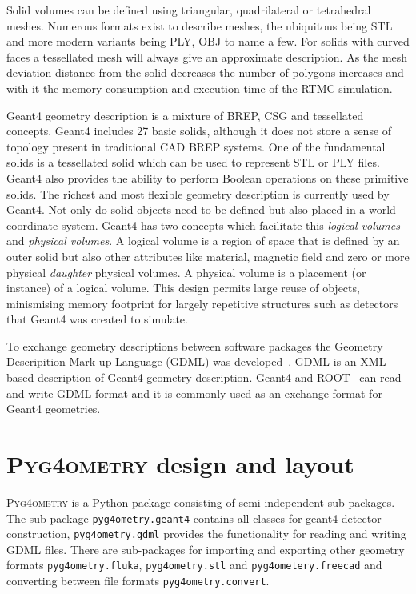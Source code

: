 \documentclass[final,5p,times,twocolumn]{elsarticle}
\newcommand{\pyinline}[1]{\lstinline[postbreak={}]{#1}}
\newcommand{\PYGEOMETRY}{\textsc{Pyg4ometry}}
\begin{document}
Solid volumes can be defined using triangular, quadrilateral or tetrahedral meshes. Numerous formats exist to describe meshes, the ubiquitous being STL and 
more modern variants being PLY, OBJ to name a few. For solids with curved faces a tessellated mesh will always give an approximate description. As the mesh 
deviation distance from the solid decreases the number of polygons increases and with it the memory consumption and execution time of the RTMC simulation. 

Geant4 geometry description is a mixture of BREP, CSG and tessellated concepts. Geant4 includes 27 basic solids, although it does not store a sense 
of topology present in traditional CAD BREP systems. One of the fundamental solids is a tessellated solid which can be used to represent STL or PLY files. 
Geant4 also provides the ability to perform Boolean operations on these primitive solids. The richest and most flexible geometry description is currently used by
Geant4. Not only do solid objects need to be defined but also placed in a world coordinate system. Geant4 has two concepts which facilitate this {\em logical volumes} and {\em physical volumes}. A logical volume is a region of space that is defined by an outer solid but also other attributes like material, magnetic field 
and zero or more physical {\em daughter} physical volumes. A physical volume is a placement (or instance) of a logical volume. This design permits large reuse of objects, minismising memory footprint for largely repetitive structures such as detectors that Geant4 was created to simulate.  


To exchange geometry descriptions between software packages the Geometry Descripition Mark-up Language (GDML) was developed~\cite{GDML}. 
GDML is an XML-based description of Geant4 geometry description. Geant4 and ROOT~\cite{fons_rademakers_2019_3895860} can read and write 
GDML format and it is commonly used as an exchange format for Geant4 geometries. 

\section{\PYGEOMETRY{} design and layout}
\PYGEOMETRY{} is a Python package consisting of semi-independent sub-packages. The sub-package \pyinline{pyg4ometry.geant4} contains all classes for 
geant4 detector construction, \pyinline{pyg4ometry.gdml} provides the functionality for reading and writing GDML files. There are sub-packages for importing and exporting other geometry formats  \pyinline{pyg4ometry.fluka}, \pyinline{pyg4ometry.stl} and \pyinline{pyg4ometery.freecad} and converting between file formats \verb|pyg4ometry.convert|.
\end{document}

